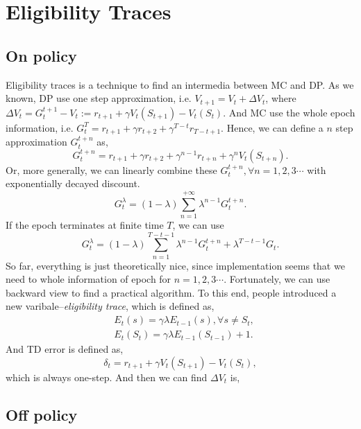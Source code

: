 \documentclass[11pt,a4paper]{article}
\begin{document}
\section{Eligibility Traces}
\subsection{On policy}
Eligibility traces is a technique to find an intermedia between MC and DP. As we known, DP use one step approximation, i.e. $V_{t+1} = V_t +\Delta V_t$, where $\Delta V_t = G_{t}^{t+1} - V_t := r_{t+1} + \gamma V_t(S_{t+1}) - V_t(S_t)$. And MC use the whole epoch information, i.e. $G_{t}^{T} = r_{t+1} + \gamma r_{t+2} + \gamma^{T-t}r_{T-t+1}$. Hence, we can define a $n$ step approximation $G_{t}^{t+n}$ as,
\begin{equation}
G_{t}^{t+n} = r_{t+1} + \gamma r_{t+2} + \gamma^{n-1}r_{t+n} + \gamma^n V_t(S_{t+n}).
\end{equation}
Or, more generally, we can linearly combine these $G_{t}^{t+n}, \forall n =1,2,3\cdots$ with exponentially decayed discount.
\begin{equation}
G_{t}^{\lambda} = (1-\lambda) \sum_{n=1}^{+\infty} \lambda^{n-1} G_t^{t+n}.
\end{equation}
If the epoch terminates at finite time $T$, we can use 
\begin{equation}
G_t^{\lambda} = (1-\lambda)\sum_{n=1}^{T-t-1}\lambda^{n-1}G_t^{t+n} + \lambda^{T-t-1}G_t.
\end{equation}
So far, everything is just theoretically nice, since implementation seems that we need to whole information of epoch for $n =1,2,3\cdots$. Fortunately, we can use backward view to find a practical algorithm. To this end, people introduced a new varibale--\emph{eligibility trace}, which is defined as,
\begin{eqnarray}
& E_t(s) = \gamma \lambda E_{t-1}(s), \forall s \neq S_t, \\ 
& E_t(S_t) = \gamma \lambda E_{t-1}(S_{t-1}) + 1.
\end{eqnarray}
And TD error is defined as, 
\begin{equation}
    \delta_t = r_{t+1} + \gamma V_t(S_{t+1}) - V_t(S_t),
\end{equation}
which is always one-step. And then we can find $\Delta V_t$ is,


\subsection{Off policy}
\end{document}

